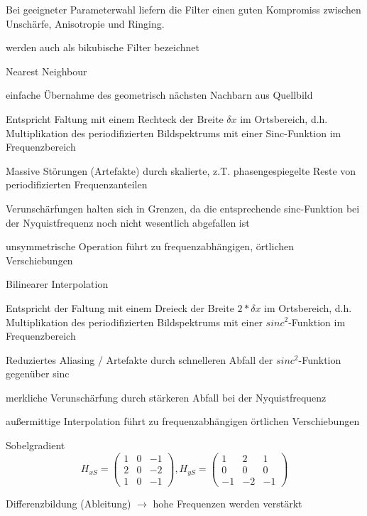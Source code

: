 \documentclass[landscape]{article}
\begin{document}
\begin{multicols}{3}
\begin{description*}
\begin{itemize*}
      \item Bei geeigneter Parameterwahl liefern die Filter einen guten Kompromiss zwischen Unschärfe, Anisotropie und Ringing.
      \item werden auch als bikubische Filter bezeichnet
    \end{itemize*}
    \item[Nearest Neighbour]
    \begin{itemize*}
      \item einfache Übernahme des geometrisch nächsten Nachbarn aus Quellbild
      \item Entspricht Faltung mit einem Rechteck der Breite $\delta x$ im Ortsbereich, d.h. Multiplikation des periodifizierten Bildspektrums mit einer Sinc-Funktion im Frequenzbereich
      \item Massive Störungen (Artefakte) durch skalierte, z.T. phasengespiegelte Reste von periodifizierten Frequenzanteilen
      \item Verunschärfungen halten sich in Grenzen, da die entsprechende sinc-Funktion bei der Nyquistfrequenz noch nicht wesentlich abgefallen ist
      \item unsymmetrische Operation führt zu frequenzabhängigen, örtlichen Verschiebungen
    \end{itemize*}
    \item[Bilinearer Interpolation]
    \begin{itemize*}
      \item Entspricht der Faltung mit einem Dreieck der Breite $2*\delta x$ im Ortsbereich, d.h. Multiplikation des periodifizierten Bildspektrums mit einer $sinc^2$-Funktion im Frequenzbereich
      \item Reduziertes Aliasing / Artefakte durch schnelleren Abfall der $sinc^2$-Funktion gegenüber sinc
      \item merkliche Verunschärfung durch stärkeren Abfall bei der Nyquistfrequenz
      \item außermittige Interpolation führt zu frequenzabhängigen örtlichen Verschiebungen
    \end{itemize*}
    \item[Sobelgradient] $$H_{xS} =\begin{pmatrix} 1&0&-1\\ 2&0&-2\\ 1&0&-1\end{pmatrix}, H_{yS}=\begin{pmatrix} 1&2&1\\ 0&0&0\\ -1&-2&-1 \end{pmatrix}$$
    \item[Differenzbildung] (Ableitung) $\rightarrow$ hohe Frequenzen werden verstärkt
  \end{description*}
  
  
\end{multicols}
\end{document}
